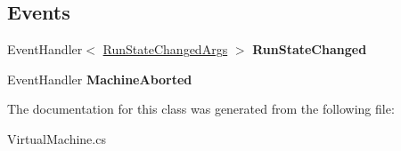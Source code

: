 \subsection*{Events}
\begin{DoxyCompactItemize}
\item 
\hypertarget{class_eimu_1_1_core_1_1_virtual_machine_aa281a1893e505124d2a12f0fc66cda5e}{
EventHandler$<$ \hyperlink{class_eimu_1_1_core_1_1_run_state_changed_args}{RunStateChangedArgs} $>$ {\bfseries RunStateChanged}}
\label{class_eimu_1_1_core_1_1_virtual_machine_aa281a1893e505124d2a12f0fc66cda5e}

\item 
\hypertarget{class_eimu_1_1_core_1_1_virtual_machine_aece34183693373f6f9a9f8f9fe6a7c24}{
EventHandler {\bfseries MachineAborted}}
\label{class_eimu_1_1_core_1_1_virtual_machine_aece34183693373f6f9a9f8f9fe6a7c24}

\end{DoxyCompactItemize}


The documentation for this class was generated from the following file:\begin{DoxyCompactItemize}
\item 
VirtualMachine.cs\end{DoxyCompactItemize}
